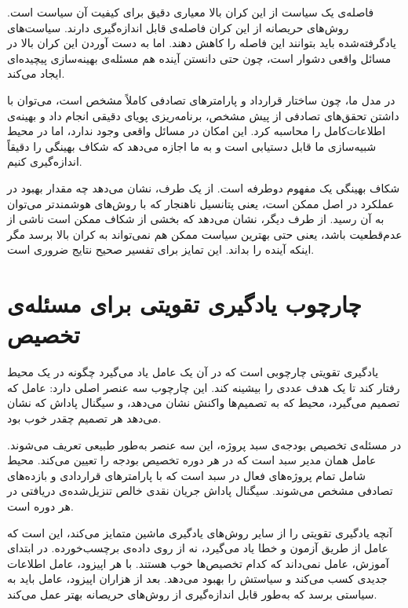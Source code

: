 فاصله‌ی یک سیاست از این کران بالا معیاری دقیق برای کیفیت آن
سیاست است. روش‌های حریصانه از این کران فاصله‌ی قابل اندازه‌گیری
دارند. سیاست‌های یادگرفته‌شده باید بتوانند این فاصله را کاهش دهند.
اما به دست آوردن این کران بالا در مسائل واقعی دشوار است، چون
حتی دانستن آینده هم مسئله‌ی بهینه‌سازی پیچیده‌ای ایجاد می‌کند.

در مدل ما، چون ساختار قرارداد و پارامترهای تصادفی کاملاً مشخص است،
می‌توان با داشتن تحقق‌های تصادفی از پیش مشخص، برنامه‌ریزی پویای
دقیقی انجام داد و بهینه‌ی اطلاعات‌کامل را محاسبه کرد. این
امکان در مسائل واقعی وجود ندارد، اما در محیط شبیه‌سازی ما
قابل دستیابی است و به ما اجازه می‌دهد که شکاف بهینگی را دقیقاً
اندازه‌گیری کنیم.

شکاف بهینگی یک مفهوم دوطرفه است. از یک طرف، نشان می‌دهد چه
مقدار بهبود در عملکرد در اصل ممکن است، یعنی پتانسیل ناهنجار
که با روش‌های هوشمندتر می‌توان به آن رسید. از طرف دیگر، نشان
می‌دهد که بخشی از شکاف ممکن است ناشی از عدم‌قطعیت باشد، یعنی
حتی بهترین سیاست ممکن هم نمی‌تواند به کران بالا برسد مگر اینکه
آینده را بداند. این تمایز برای تفسیر صحیح نتایج ضروری است.

\section{چارچوب یادگیری تقویتی برای مسئله‌ی تخصیص}
\label{sec:rl_framework}

یادگیری تقویتی چارچوبی است که در آن یک عامل یاد می‌گیرد چگونه
در یک محیط رفتار کند تا یک هدف عددی را بیشینه کند. این چارچوب
سه عنصر اصلی دارد: عامل که تصمیم می‌گیرد، محیط که به تصمیم‌ها
واکنش نشان می‌دهد، و سیگنال پاداش که نشان می‌دهد هر تصمیم
چقدر خوب بود.

در مسئله‌ی تخصیص بودجه‌ی سبد پروژه، این سه عنصر به‌طور طبیعی
تعریف می‌شوند. عامل همان مدیر سبد است که در هر دوره تخصیص
بودجه را تعیین می‌کند. محیط شامل تمام پروژه‌های فعال در سبد
است که با پارامترهای قراردادی و بازده‌های تصادفی مشخص می‌شوند.
سیگنال پاداش جریان نقدی خالص تنزیل‌شده‌ی دریافتی در هر دوره است.

آنچه یادگیری تقویتی را از سایر روش‌های یادگیری ماشین متمایز می‌کند،
این است که عامل از طریق آزمون و خطا یاد می‌گیرد، نه از روی
داده‌ی برچسب‌خورده. در ابتدای آموزش، عامل نمی‌داند که کدام
تخصیص‌ها خوب هستند. با هر اپیزود، عامل اطلاعات جدیدی کسب
می‌کند و سیاستش را بهبود می‌دهد. بعد از هزاران اپیزود، عامل
باید به سیاستی برسد که به‌طور قابل اندازه‌گیری از روش‌های
حریصانه بهتر عمل می‌کند.

